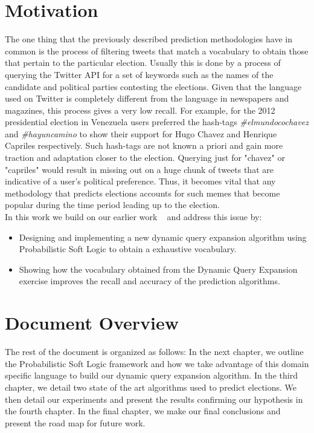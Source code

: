 \section{Motivation}
The one thing that the previously described prediction methodologies have in common is the process of filtering tweets that match a vocabulary to obtain those that pertain to the particular election.
Usually this is done by a process of querying the Twitter API for a set of keywords such as the names of the candidate and political parties contesting the elections.
Given that the language used on Twitter is completely different from the language in newspapers and magazines, this process gives a very low recall.
For example, for the 2012 presidential election in Venezuela users preferred  the hash-tags \emph{\#elmundocochavez} and \emph{\#hayuncamino} to show their support for Hugo Chavez and Henrique Capriles respectively.
Such hash-tags are not known a priori and gain more traction and adaptation closer to the election.
Querying just for "chavez" or "capriles" would result in missing out on a huge chunk of tweets that are indicative of a user's political preference.
Thus, it becomes vital that any methodology that predicts elections accounts for such memes that become popular during the time period leading up to the election.\\
In this work we build on our earlier work ~\cite{huang2012social} and address this issue by:
\begin{itemize}
\item
Designing and implementing a new dynamic query expansion algorithm using Probabilistic Soft Logic to obtain a exhaustive vocabulary.
\item
Showing how the vocabulary obtained from the Dynamic Query Expansion exercise improves the recall and accuracy of the prediction algorithms.
\end{itemize}
\section{Document Overview}
The rest of the document is organized as follows:
\newline In the next chapter, we outline the Probabilistic Soft Logic framework and how we take advantage of this domain specific language to build our dynamic query expansion algorithm.
\newline In the third chapter, we detail two state of the art algorithms used to predict elections.
\newline We then detail our experiments and present the results confirming our hypothesis in the fourth chapter.
\newline In the final chapter, we make our final conclusions and present the road map for future work.
